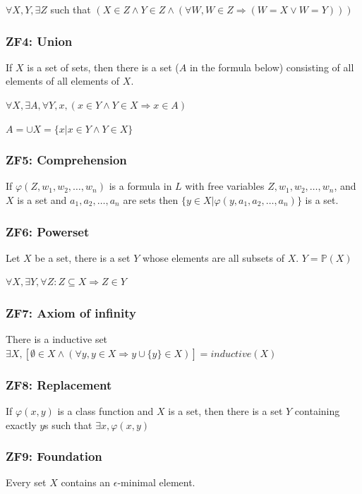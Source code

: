 \documentclass[12pt,a4paper]{ctexrep}
\begin{document}
$\forall X,Y, \exists Z$ such that $(X \in Z \wedge Y \in Z \wedge(\forall W, W\in Z \Rightarrow (W = X \vee W = Y)))$
\subsubsection{ZF4: Union}
If $X$ is a set of sets, then there is a set ($A$ in the formula below) consisting of all elements of all elements of $X$.

$\forall X, \exists A, \forall Y,x, (x \in Y\wedge Y \in X \Rightarrow x \in A)$

$A = \cup X = \{x| x\in Y \wedge Y\in X\}$

\subsubsection{ZF5: Comprehension}
If $\varphi(Z,w_1,w_2,\dots,w_n)$ is a formula in $L$ with free variables $Z,w_1,w_2,\dots,w_n$, and $X$ is a set and $a_1,a_2,\dots,a_n$ are sets then $\{y\in X| \varphi(y,a_1,a_2,\dots,a_n)\}$ is a set. 

\subsubsection{ZF6: Powerset}
Let $X$ be a set, there is a set $Y$ whose elements are all subsets of $X$. $Y = \mathbb{P}(X)$

$\forall X, \exists Y, \forall Z : Z \subseteq X \Rightarrow Z \in Y$

\subsubsection{ZF7: Axiom of infinity}
There is a inductive set $\exists X, [\emptyset \in X \wedge (\forall y, y \in X \Rightarrow y \cup \{y\} \in X)] = inductive(X)$

\subsubsection{ZF8: Replacement}
If $\varphi(x,y)$ is a class function and $X$ is a set, then there is a set $Y$ containing exactly $y$s such that $\exists x, \varphi(x,y)$

\subsubsection{ZF9: Foundation}
Every set $X$ contains an $\epsilon$-minimal element.
\end{document}
